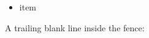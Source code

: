 \begin{itemize}
\item
  item

\begin{Shaded}
\begin{Highlighting}[]
\FunctionTok{\{}\FunctionTok{:} \OtherTok{[}\OtherTok{,} \OtherTok{,} \OtherTok{]}\FunctionTok{\}}
\end{Highlighting}
\end{Shaded}
\end{itemize}

A trailing blank line inside the fence:

\begin{Shaded}
\begin{Highlighting}[]
\OperatorTok{=} 
\end{Highlighting}
\end{Shaded}
